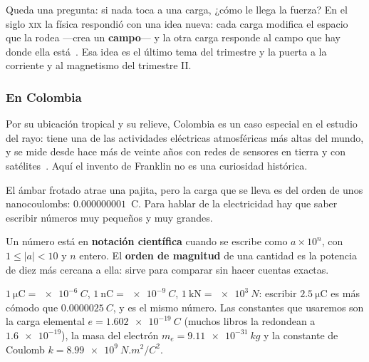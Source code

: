 \documentclass[11pt]{article}
\begin{document}
Queda una pregunta: si nada toca a una carga, ¿cómo le llega la fuerza? En el
siglo \textsc{xix} la física respondió con una idea nueva: cada carga modifica
el espacio que la rodea ---crea un \textbf{campo}--- y la otra carga responde
al campo que hay donde ella está~\cite{serway}. Esa idea es el último tema del
trimestre y la puerta a la corriente y al magnetismo del trimestre II.

\subsubsection*{En Colombia}

Por su ubicación tropical y su relieve, Colombia es un caso especial en el
estudio del rayo: tiene una de las actividades eléctricas atmosféricas más
altas del mundo, y se mide desde hace más de veinte años con redes de sensores
en tierra y con satélites~\cite{younes2020}. Aquí el invento de Franklin no es
una curiosidad histórica.

\label{tema:notacion}

\begin{hilo}
El ámbar frotado atrae una pajita, pero la carga que se lleva es del orden de
unos nanocoulombs: $\num{0,000000001}$~C. Para hablar de la electricidad hay
que saber escribir números muy pequeños y muy grandes.
\end{hilo}

\begin{definicion}
Un número está en \textbf{notación científica} cuando se escribe como
$a \times 10^{n}$, con $1 \le |a| < 10$ y $n$ entero. El \textbf{orden de
magnitud} de una cantidad es la potencia de diez más cercana a ella: sirve
para comparar sin hacer cuentas exactas.
\end{definicion}

\begin{ejemplo}
$\qty{1}{\micro\coulomb} = \qty{e-6}{C}$, $\qty{1}{\nano\coulomb} =
\qty{e-9}{C}$, $\qty{1}{\kilo\newton} = \qty{e3}{N}$: escribir
$\qty{2,5}{\micro\coulomb}$ es más cómodo que $\qty{0,0000025}{C}$, y es el
mismo número. Las constantes que usaremos son la carga elemental
$e = \qty{1,602e-19}{C}$ (muchos libros la redondean a $\num{1,6e-19}$), la
masa del electrón $m_e = \qty{9,11e-31}{kg}$ y la constante de Coulomb
$k = \qty{8,99e9}{N.m^2/C^2}$.
\end{ejemplo}
\end{document}
